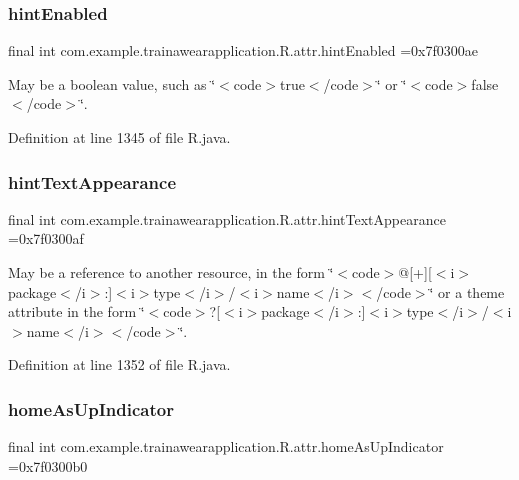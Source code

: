\subsubsection{\texorpdfstring{hintEnabled}{hintEnabled}}
{\footnotesize\ttfamily final int com.\+example.\+trainawearapplication.\+R.\+attr.\+hint\+Enabled =0x7f0300ae\hspace{0.3cm}{\ttfamily [static]}}

May be a boolean value, such as \char`\"{}$<$code$>$true$<$/code$>$\char`\"{} or \char`\"{}$<$code$>$false$<$/code$>$\char`\"{}. 

Definition at line 1345 of file R.\+java.

\mbox{\label{classcom_1_1example_1_1trainawearapplication_1_1_r_1_1attr_adbb97bf82712b07fcc18eb977d167e37}} 
\subsubsection{\texorpdfstring{hintTextAppearance}{hintTextAppearance}}
{\footnotesize\ttfamily final int com.\+example.\+trainawearapplication.\+R.\+attr.\+hint\+Text\+Appearance =0x7f0300af\hspace{0.3cm}{\ttfamily [static]}}

May be a reference to another resource, in the form \char`\"{}$<$code$>$@\mbox{[}+\mbox{]}\mbox{[}$<$i$>$package$<$/i$>$\+:\mbox{]}$<$i$>$type$<$/i$>$/$<$i$>$name$<$/i$>$$<$/code$>$\char`\"{} or a theme attribute in the form \char`\"{}$<$code$>$?\mbox{[}$<$i$>$package$<$/i$>$\+:\mbox{]}$<$i$>$type$<$/i$>$/$<$i$>$name$<$/i$>$$<$/code$>$\char`\"{}. 

Definition at line 1352 of file R.\+java.

\mbox{\label{classcom_1_1example_1_1trainawearapplication_1_1_r_1_1attr_a07191ab6b641a690afd11e982de52fd8}} 
\subsubsection{\texorpdfstring{homeAsUpIndicator}{homeAsUpIndicator}}
{\footnotesize\ttfamily final int com.\+example.\+trainawearapplication.\+R.\+attr.\+home\+As\+Up\+Indicator =0x7f0300b0\hspace{0.3cm}{\ttfamily [static]}}

